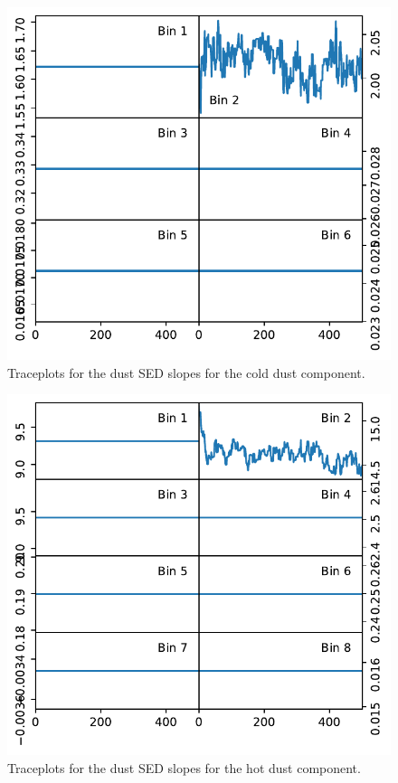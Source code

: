 \documentclass{aa}
\begin{document}
\begin{figure}
    \centering
    \includegraphics[width=\columnwidth]{"figures/traceplots_dust_sed_slopes_cold_dust.pdf"}
    \caption{Traceplots for the dust SED slopes for the cold dust component.}
    \label{fig:traceplots_dust_sed_slopes_colddust}
\end{figure}

\begin{figure}
    \centering
    \includegraphics[width=\columnwidth]{"figures/traceplots_dust_sed_slopes_hot_dust.pdf"}
    \caption{Traceplots for the dust SED slopes for the hot dust component.}
    \label{fig:traceplots_dust_sed_slopes_hotdust}
\end{figure}
\end{document}
